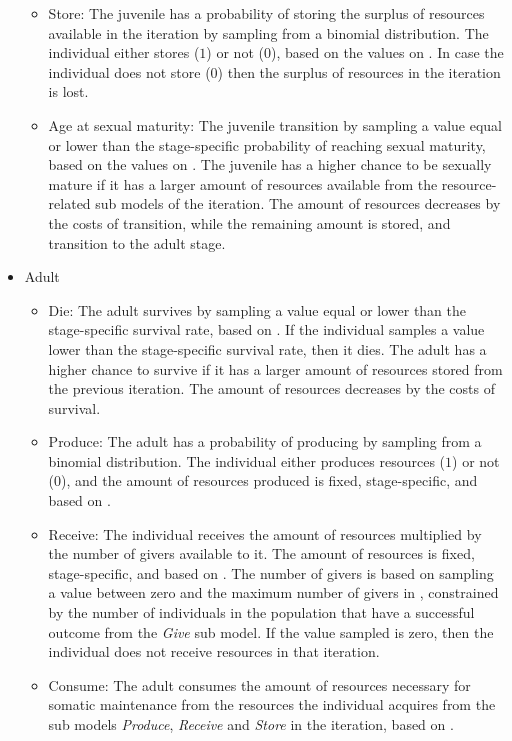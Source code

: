 \documentclass{article}
\begin{document}
\begin{itemize}
\begin{itemize}
        \item Store: The juvenile has a probability of storing the surplus of resources available in the iteration by sampling from a binomial distribution. The individual either stores ($1$) or not ($0$), based on the values on \citep{bowles2011cultivation}. In case the individual does not store ($0$) then the surplus of resources in the iteration is lost.
        \item Age at sexual maturity: The juvenile transition by sampling a value equal or lower than the stage-specific probability of reaching sexual maturity, based on the values on \citep{ellison2017reproductive}. The juvenile has a higher chance to be sexually mature if it has a larger amount of resources available from the resource-related sub models of the iteration. The amount of resources decreases by the costs of transition, while the remaining amount is stored, and transition to the adult stage.
    \end{itemize}
    \item Adult
    \begin{itemize}
        \item Die: The adult survives by sampling a value equal or lower than the stage-specific survival rate, based on \cite{gurven2007longevity}. If the individual samples a value lower than the stage-specific survival rate, then it dies. The adult has a higher chance to survive if it has a larger amount of resources stored from the previous iteration. The amount of resources decreases by the costs of survival.
        \item Produce: The adult has a probability of producing by sampling from a binomial distribution. The individual either produces resources ($1$) or not ($0$), and the amount of resources produced is fixed, stage-specific, and based on \cite{koster2020life}.
        \item Receive: The individual receives the amount of resources multiplied by the number of givers available to it. The amount of resources is fixed, stage-specific, and based on \cite{gurven2004give}. The number of givers is based on sampling a value between zero and the maximum number of givers in \cite{gurven2004give}, constrained by the number of individuals in the population that have a successful outcome from the \emph{Give} sub model. If the value sampled is zero, then the individual does not receive resources in that iteration.
        \item Consume: The adult consumes the amount of resources necessary for somatic maintenance from the resources the individual acquires from the sub models \emph{Produce}, \emph{Receive} and \emph{Store} in the iteration, based on \cite{kaplan2000theory, pontzer2021daily}.

\end{itemize}
\end{itemize}
\end{document}
